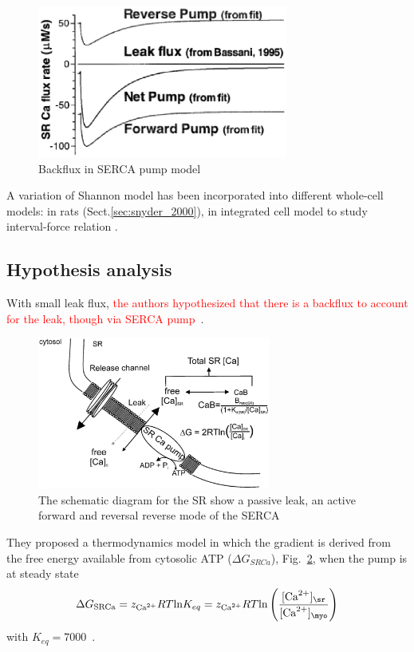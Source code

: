 \begin{figure}[hbt]
  \centerline{\includegraphics[height=5cm,
    angle=0]{./images/Shannon2000_backflux.eps}}
  \caption{Backflux in SERCA pump model}
  \label{fig:Shannon2000_backflux}
\end{figure}

A variation of Shannon model has been incorporated into different whole-cell
models: in rats \citep{snyder2000mmc} (Sect.\ref{sec:snyder_2000}), in
integrated cell model to study interval-force relation \citep{rice2001mch}.


\subsection{Hypothesis analysis}
\label{sec:hypothesis-analysis-10}

With small leak flux,
\textcolor{red}{the authors hypothesized that there is a backflux to
  account for the leak, though via SERCA
  pump}~\citep{shannon1998,shannon2000rms,shannon2002}.


\begin{figure}[hbt]
  \centerline{\includegraphics[height=5cm,
    angle=0]{./images/shannon_serca.eps}}
\caption{The schematic diagram for the SR show a passive leak, an
  active forward and reversal reverse mode of the SERCA}
\label{fig:shannon_serca}
\end{figure}


They proposed a thermodynamics model in which the gradient is derived
from the free energy available from cytosolic ATP ($\Delta G_{SRCa}$),
Fig.~\ref{fig:shannon_serca}, when the pump is at steady state
\begin{equation}
  \label{eq:1025}
  \Delta G_{\text{SRCa}} = z_\Ca RT \ln K_{eq}=z_\Ca RT \ln\left(\frac{[\Ca]_\sr}{[\Ca]_\myo}\right)
\end{equation}
with $K_{eq}=7000$~\citep{shannon1997}.

